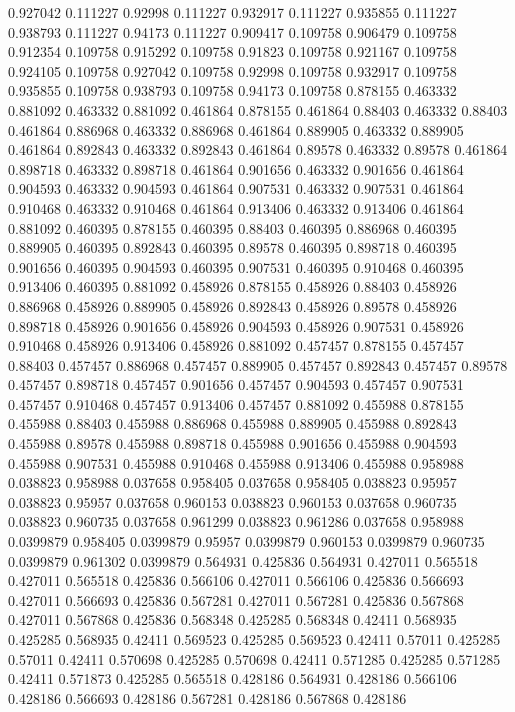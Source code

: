 0.927042 0.111227
0.92998 0.111227
0.932917 0.111227
0.935855 0.111227
0.938793 0.111227
0.94173 0.111227
0.909417 0.109758
0.906479 0.109758
0.912354 0.109758
0.915292 0.109758
0.91823 0.109758
0.921167 0.109758
0.924105 0.109758
0.927042 0.109758
0.92998 0.109758
0.932917 0.109758
0.935855 0.109758
0.938793 0.109758
0.94173 0.109758
0.878155 0.463332
0.881092 0.463332
0.881092 0.461864
0.878155 0.461864
0.88403 0.463332
0.88403 0.461864
0.886968 0.463332
0.886968 0.461864
0.889905 0.463332
0.889905 0.461864
0.892843 0.463332
0.892843 0.461864
0.89578 0.463332
0.89578 0.461864
0.898718 0.463332
0.898718 0.461864
0.901656 0.463332
0.901656 0.461864
0.904593 0.463332
0.904593 0.461864
0.907531 0.463332
0.907531 0.461864
0.910468 0.463332
0.910468 0.461864
0.913406 0.463332
0.913406 0.461864
0.881092 0.460395
0.878155 0.460395
0.88403 0.460395
0.886968 0.460395
0.889905 0.460395
0.892843 0.460395
0.89578 0.460395
0.898718 0.460395
0.901656 0.460395
0.904593 0.460395
0.907531 0.460395
0.910468 0.460395
0.913406 0.460395
0.881092 0.458926
0.878155 0.458926
0.88403 0.458926
0.886968 0.458926
0.889905 0.458926
0.892843 0.458926
0.89578 0.458926
0.898718 0.458926
0.901656 0.458926
0.904593 0.458926
0.907531 0.458926
0.910468 0.458926
0.913406 0.458926
0.881092 0.457457
0.878155 0.457457
0.88403 0.457457
0.886968 0.457457
0.889905 0.457457
0.892843 0.457457
0.89578 0.457457
0.898718 0.457457
0.901656 0.457457
0.904593 0.457457
0.907531 0.457457
0.910468 0.457457
0.913406 0.457457
0.881092 0.455988
0.878155 0.455988
0.88403 0.455988
0.886968 0.455988
0.889905 0.455988
0.892843 0.455988
0.89578 0.455988
0.898718 0.455988
0.901656 0.455988
0.904593 0.455988
0.907531 0.455988
0.910468 0.455988
0.913406 0.455988
0.958988 0.038823
0.958988 0.037658
0.958405 0.037658
0.958405 0.038823
0.95957 0.038823
0.95957 0.037658
0.960153 0.038823
0.960153 0.037658
0.960735 0.038823
0.960735 0.037658
0.961299 0.038823
0.961286 0.037658
0.958988 0.0399879
0.958405 0.0399879
0.95957 0.0399879
0.960153 0.0399879
0.960735 0.0399879
0.961302 0.0399879
0.564931 0.425836
0.564931 0.427011
0.565518 0.427011
0.565518 0.425836
0.566106 0.427011
0.566106 0.425836
0.566693 0.427011
0.566693 0.425836
0.567281 0.427011
0.567281 0.425836
0.567868 0.427011
0.567868 0.425836
0.568348 0.425285
0.568348 0.42411
0.568935 0.425285
0.568935 0.42411
0.569523 0.425285
0.569523 0.42411
0.57011 0.425285
0.57011 0.42411
0.570698 0.425285
0.570698 0.42411
0.571285 0.425285
0.571285 0.42411
0.571873 0.425285
0.565518 0.428186
0.564931 0.428186
0.566106 0.428186
0.566693 0.428186
0.567281 0.428186
0.567868 0.428186
